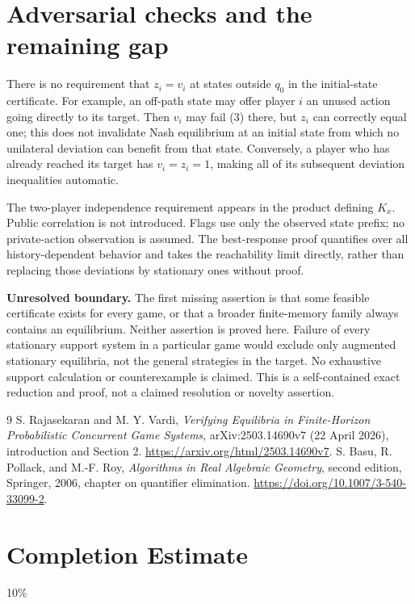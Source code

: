 \documentclass[11pt]{article}
\theoremstyle{remark}\newtheorem{remark}[theorem]{Remark}
\begin{document}
\section*{Adversarial checks and the remaining gap}
There is no requirement that $z_i=v_i$ at states outside $q_0$ in the initial-state certificate. For example, an off-path state may offer player $i$ an unused action going directly to its target. Then $v_i$ may fail (3) there, but $z_i$ can correctly equal one; this does not invalidate Nash equilibrium at an initial state from which no unilateral deviation can benefit from that state. Conversely, a player who has already reached its target has $v_i=z_i=1$, making all of its subsequent deviation inequalities automatic.

The two-player independence requirement appears in the product defining $K_x$. Public correlation is not introduced. Flags use only the observed state prefix; no private-action observation is assumed. The best-response proof quantifies over all history-dependent behavior and takes the reachability limit directly, rather than replacing those deviations by stationary ones without proof.

\textbf{Unresolved boundary.} The first missing assertion is that some feasible certificate exists for every game, or that a broader finite-memory family always contains an equilibrium. Neither assertion is proved here. Failure of every stationary support system in a particular game would exclude only augmented stationary equilibria, not the general strategies in the target. No exhaustive support calculation or counterexample is claimed. This is a self-contained exact reduction and proof, not a claimed resolution or novelty assertion.

\begin{thebibliography}{9}
 S. Rajasekaran and M. Y. Vardi, \emph{Verifying Equilibria in Finite-Horizon Probabilistic Concurrent Game Systems}, arXiv:2503.14690v7 (22 April 2026), introduction and Section 2. \url{https://arxiv.org/html/2503.14690v7}.
 S. Basu, R. Pollack, and M.-F. Roy, \emph{Algorithms in Real Algebraic Geometry}, second edition, Springer, 2006, chapter on quantifier elimination. \url{https://doi.org/10.1007/3-540-33099-2}.
\end{thebibliography}

\section{Completion Estimate}
10\%
\end{document}
